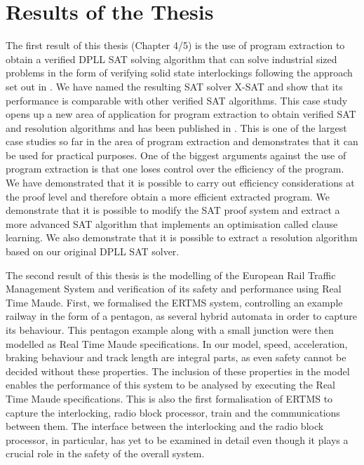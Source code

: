 \section{Results of the Thesis}
 

The first result of this thesis (Chapter 4/5) is the use of program extraction to obtain a verified DPLL SAT solving algorithm that can solve industrial sized problems in the form of verifying solid state interlockings following the approach set out in \cite{AL14a}. We have named the resulting SAT solver X-SAT and show that its performance is comparable with other verified SAT algorithms. This case study opens up a new area of application for program extraction to obtain verified SAT and resolution algorithms and has been published in \cite{AL12,AL14b}. This is one of the largest case studies so far in the area of program extraction and demonstrates that it can be used for practical purposes.  One of the biggest arguments against the use of program extraction is that one loses control over the efficiency of the program. We have demonstrated that it is possible to carry out efficiency considerations at the proof level and therefore obtain a more efficient extracted program. We demonstrate that it is possible to modify the SAT proof system and extract a more advanced SAT algorithm that implements an optimisation called clause learning. We also demonstrate that it is possible to extract a resolution algorithm based on our original DPLL SAT solver.


The second result of this thesis is the modelling of the European Rail Traffic Management System and verification of its safety and performance using Real Time Maude. First, we formalised the ERTMS system, controlling an example railway in the form of a pentagon, as several hybrid automata in order to capture its behaviour.  This pentagon example along with a small junction were then modelled as Real Time Maude specifications. In our model, speed, acceleration, braking behaviour and track length are integral parts, as even safety cannot be decided without these properties. The inclusion of these properties in the model enables the performance of this system to be analysed by executing the Real Time Maude specifications. This is also the first formalisation of ERTMS to capture the interlocking, radio block processor, train and the communications between them. The interface between the interlocking and the radio block processor, in particular, has yet to be examined in detail even though it plays a crucial role in the safety of the overall system.

